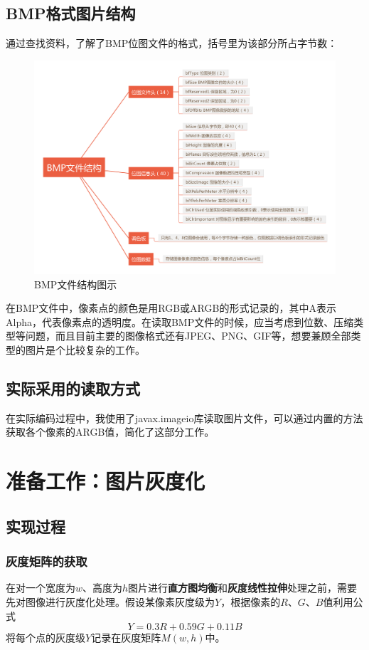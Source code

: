 \documentclass[UTF8]{ctexart}
\begin{document}
	\subsection{BMP格式图片结构}
	通过查找资料，了解了BMP位图文件的格式，括号里为该部分所占字节数：\newline
		\begin{figure}[H]
		\centering
		\includegraphics[width=1\textwidth]{bmp_format.png}
		\caption{BMP文件结构图示}
		\end{figure}
	\indent 在BMP文件中，像素点的颜色是用RGB或ARGB的形式记录的，其中A表示Alpha，代表像素点的透明度。在读取BMP文件的时候，应当考虑到位数、压缩类型等问题，而且目前主要的图像格式还有JPEG、PNG、GIF等，想要兼顾全部类型的图片是个比较复杂的工作。

	\subsection{实际采用的读取方式}
	在实际编码过程中，我使用了javax.imageio库读取图片文件，可以通过内置的方法获取各个像素的ARGB值，简化了这部分工作。

	\section{准备工作：图片灰度化}
		\subsection{实现过程}
			\subsubsection{灰度矩阵的获取}
			在对一个宽度为$w$、高度为$h$图片进行\textbf{直方图均衡}和\textbf{灰度线性拉伸}处理之前，需要先对图像进行灰度化处理。假设某像素灰度级为$Y$，根据像素的$R$、$G$、$B$值利用公式
			\[ Y=0.3R+0.59G+0.11B \]
			将每个点的灰度级$Y$记录在灰度矩阵$M(w,h)$中。
\end{document}
